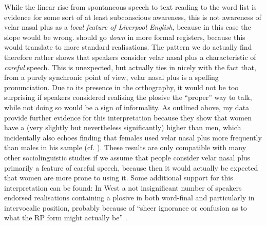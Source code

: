 While the linear rise from spontaneous speech to text reading to the word list is evidence for some sort of at least subconscious awareness, this is not awareness of velar nasal plus as a \emph{local feature of Liverpool English}, because in this case the slope would be wrong.
 should go \emph{down} in more formal registers, because this would translate to more standard realisations.
The pattern we do actually find therefore rather shows that speakers consider velar nasal plus a characteristic of \emph{careful} speech.
This is unexpected, but actually ties in nicely with the fact that, from a purely synchronic point of view, velar nasal plus is a spelling pronunciation.
Due to its presence in the orthography, it would not be too surprising if speakers considered realising the plosive the ``proper'' way to talk, while not doing so would be a sign of informality.
As outlined above, my data provide further evidence for this interpretation because they show that women have a (very slightly but nevertheless significantly) higher  than men, which incidentally also echoes  finding that females used velar nasal plus more frequently than males in his sample (cf. ).
These results are only compatible with many other sociolinguistic studies if we assume that people consider velar nasal plus primarily a feature of careful speech, because then it would actually be expected that women are more prone to using it.
Some additional support for this interpretation can be found: In West  a not insignificant number of speakers endorsed realisations containing a plosive in both word-final and particularly in intervocalic position, probably because of ``sheer ignorance or confusion as to what the RP form might actually be'' \parencite[101]{newbrook1999}.

